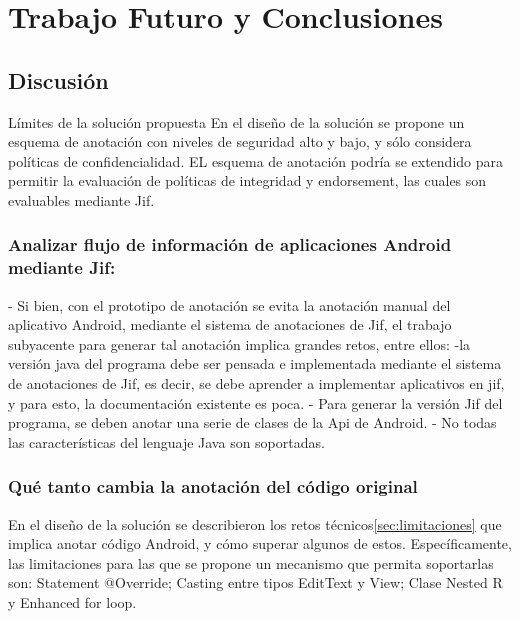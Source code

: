 \label{ch:trabajoFuturo}
\chapter{Trabajo Futuro y Conclusiones}
\section{Discusión}
Límites de la solución propuesta\newline
En el diseño de la solución se propone un esquema de anotación con niveles de
seguridad alto y bajo, y sólo considera políticas de confidencialidad. EL
esquema de anotación podría se extendido para permitir la evaluación de
políticas de integridad y endorsement, las cuales son evaluables mediante Jif.

\subsection{Analizar flujo de información de aplicaciones Android mediante Jif:}
- Si bien, con el prototipo de anotación se evita la anotación manual del
aplicativo Android, mediante el sistema de anotaciones de Jif, el trabajo
subyacente para generar tal anotación implica grandes retos, entre ellos:\newline
-la versión java del programa debe ser pensada e implementada mediante el
sistema de anotaciones de Jif, es decir, se debe aprender a implementar
aplicativos en jif, y para esto, la documentación existente es poca.\newline
- Para generar la versión Jif del programa, se deben anotar una serie de clases
de la Api de Android.\newline
- No todas las características del lenguaje Java son soportadas.

\subsection{Qué tanto cambia la anotación del código original}
En el diseño de la solución se describieron los retos
técnicos\ref{sec:limitaciones} que implica anotar código Android, y cómo superar
algunos de estos. Específicamente, las limitaciones para las que se propone un
mecanismo que permita soportarlas son: Statement @Override; Casting entre tipos
EditText y View; Clase Nested R y Enhanced for loop.

